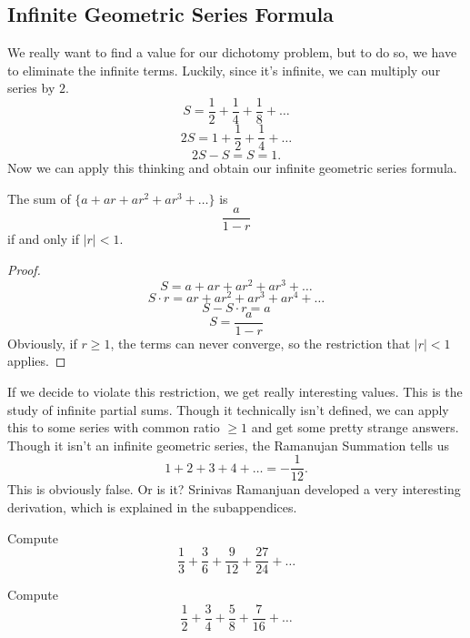\subsection{Infinite Geometric Series Formula}
We really want to find a value for our dichotomy problem, but to do so, we have to eliminate the infinite terms. Luckily, since it's infinite, we can multiply our series by $2$. 
\[S=\frac{1}{2}+\frac{1}{4}+\frac{1}{8}+\dots\]
\[2S=1+\frac{1}{2}+\frac{1}{4}+\dots\]
\[2S-S=S=1.\]
Now we can apply this thinking and obtain our infinite geometric series formula.
\begin{lemma}
    The sum of $\{a+ar+ar^2+ar^3+\dots\}$ is
    \[\frac{a}{1-r}\]
    if and only if $|r|<1$.
\end{lemma}
\begin{proof}
    \[S=a+ar+ar^2+ar^3+\dots\]
    \[S\cdot r=ar+ar^2+ar^3+ar^4+\dots\]
    \[S-S\cdot r=a\]
    \[S=\frac{a}{1-r}\]
    Obviously, if $r\geq 1$, the terms can never converge, so the restriction that $|r|<1$ applies.
\end{proof}
If we decide to violate this restriction, we get really interesting values. This is the study of infinite partial sums. Though it technically isn't defined, we can apply this to some series with common ratio $\geq 1$ and get some pretty strange answers. Though it isn't an infinite geometric series, the Ramanujan Summation tells us
\[1+2+3+4+\dots=-\frac{1}{12}.\]
This is obviously false. Or is it? Srinivas Ramanjuan developed a very interesting derivation, which is explained in the subappendices.
\begin{problem}
    Compute
    \[\frac{1}{3}+\frac{3}{6}+\frac{9}{12}+\frac{27}{24}+\dots\]
\end{problem}
\begin{problem}
    Compute
    \[\frac{1}{2}+\frac{3}{4}+\frac{5}{8}+\frac{7}{16}+\dots\]
\end{problem}
